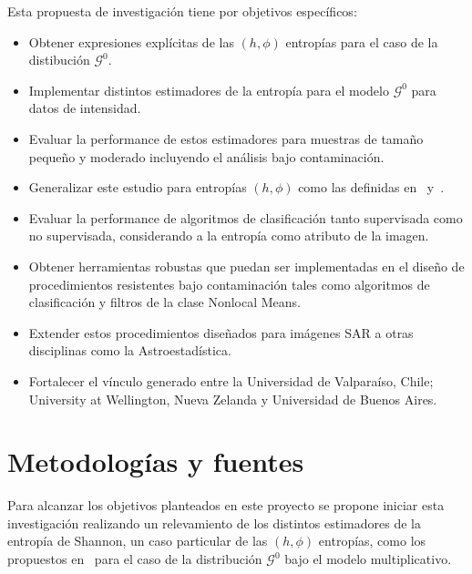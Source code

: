 \documentclass[11pt]{article}
\begin{document}
Esta propuesta de investigación tiene por objetivos específicos:
\begin{itemize}
	\item Obtener expresiones explícitas de las $(h,\phi)$ entropías para el caso de la distibución $\mathcal{G}^0$.
	\item Implementar distintos estimadores de la entropía para el modelo $\mathcal{G}^0$ para datos de intensidad.
	\item Evaluar la performance de estos estimadores para muestras de tamaño pequeño y moderado incluyendo el análisis bajo contaminación.
	\item Generalizar este estudio para entropías $(h,\phi)$ como las definidas en~\cite{Menendez1997} y~\cite{Salicru1994}. 
	\item Evaluar la performance de algoritmos de clasificación tanto supervisada como no supervisada, considerando a la entropía como atributo de la imagen.
	\item Obtener herramientas robustas que puedan ser implementadas en el diseño de procedimientos resistentes bajo contaminación tales como algoritmos de clasificación y filtros de la clase Nonlocal Means.
	\item Extender estos procedimientos diseñados para imágenes SAR a otras disciplinas como la Astroestadística.
	\item Fortalecer el vínculo generado entre la Universidad de Valparaíso, Chile; University at Wellington, Nueva Zelanda y Universidad de Buenos Aires.
\end{itemize}

\section{Metodologías y fuentes}

Para alcanzar los objetivos planteados en este proyecto se propone iniciar esta investigación realizando un relevamiento de los distintos estimadores de la entropía de Shannon, un caso particular de las $(h,\phi)$ entropías, como los propuestos en~\cite{Beirlant1997,AlOmari2013,Behmardi2011} para el caso de la distribución $\mathcal{G}^0$ bajo el modelo multiplicativo.


\end{document}
